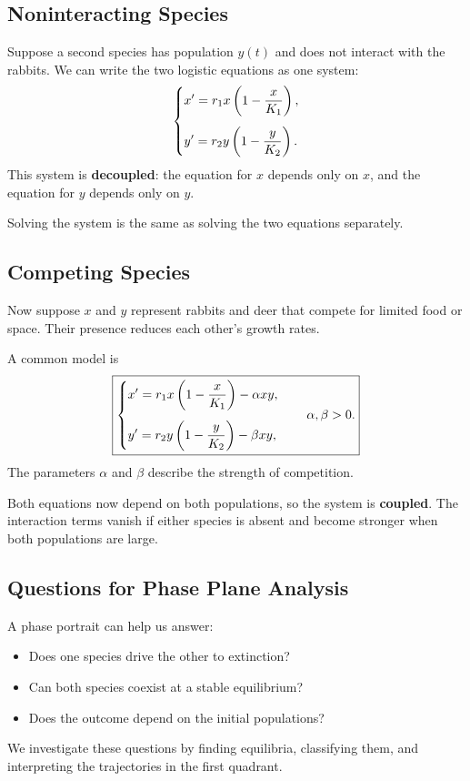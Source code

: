 \documentclass[10pt,letterpaper]{article}
\begin{document}
\subsection{Noninteracting Species}

Suppose a second species has population $y(t)$
and does not interact with the rabbits. We can write
the two logistic equations as one system:
\[
\begin{dcases}
x'=r_1x\left(1-\dfrac{x}{K_1}\right),\\[4pt]
y'=r_2y\left(1-\dfrac{y}{K_2}\right).
\end{dcases}
\]
This system is \textbf{decoupled}: the equation for
$x$ depends only on $x$, and the equation for $y$
depends only on $y$.

Solving the system is the same as solving the
two equations separately.

\subsection{Competing Species}

Now suppose $x$ and $y$ represent rabbits and deer
that compete for limited food or space. Their presence
reduces each other's growth rates.

A common model is
\[
\boxed{
\begin{dcases}
x'=r_1x\left(1-\dfrac{x}{K_1}\right)-\alpha xy,\\[4pt]
y'=r_2y\left(1-\dfrac{y}{K_2}\right)-\beta xy,
\end{dcases}
\qquad \alpha,\beta>0.
}
\]
The parameters $\alpha$ and $\beta$ describe
the strength of competition.

Both equations now depend on both populations,
so the system is \textbf{coupled}. The interaction
terms vanish if either species is absent and
become stronger when both populations are large.

\subsection{Questions for Phase Plane Analysis}

A phase portrait can help us answer:
\begin{itemize}
    \item Does one species drive the other to extinction?
    \item Can both species coexist at a stable equilibrium?
    \item Does the outcome depend on the initial populations?
\end{itemize}

We investigate these questions by finding equilibria,
classifying them, and interpreting the trajectories
in the first quadrant.
\end{document}
